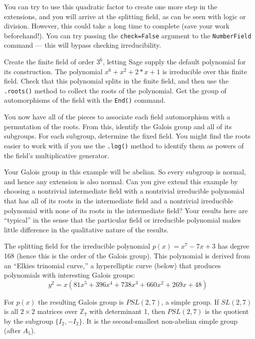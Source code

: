 %
You can try to use this quadratic factor to create one more step in the extensions, and you will arrive at the splitting field, as can be seen with logic or division.  However, this could take a long time to complete (save your work beforehand!).  You can try passing the \verb?check=False? argument to the \verb?NumberField? command --- this will bypass checking irreducibility.
\begin{sageverbatim}\end{sageverbatim}
%
%
Create the finite field of order $3^6$, letting Sage supply the default polynomial for its construction.  The polynomial $x^6+x^2+2*x+1$ is irreducible over this finite field.  Check that this polynomial splits in the finite field, and then use the \verb?.roots()? method to collect the roots of the polynomial.  Get the group of automorphisms of the field with the \verb?End()? command.\par
%
You now have all of the pieces to associate each field automorphism with a permutation of the roots.  From this, identify the Galois group and all of its subgroups.  For each subgroup, determine the fixed field.  You might find the roots easier to work with if you use the \verb?.log()? method to identify them as powers of the field's multiplicative generator.\par
%
Your Galois group in this example will be abelian.  So every subgroup is normal, and hence any extension is also normal.  Can you give extend this example by choosing a nontrivial intermediate field with a nontrivial irreducible polynomial that has all of its roots in the intermediate field and a nontrivial irreducible polynomial with none of its roots in the intermediate field?
%
Your results here are ``typical'' in the sense that the particular field or irreducible polynomial makes little difference in the qualitative nature of the results.
\begin{sageverbatim}\end{sageverbatim}
%
%
The splitting field for the irreducible polynomial $p(x)=x^7-7x+3$ has degree 168 (hence this is the order of the Galois group).  This polynomial is derived from an ``Elkies trinomial curve,'' a hyperelliptic curve (below) that produces polynomials with interesting Galois groups:
$$y^2 = x(81x^5 + 396x^4 + 738x^3 + 660x^2 + 269x + 48)$$\par
%
For $p(x)$ the resulting Galois group is $PSL(2,7)$, a simple group.  If $SL(2,7)$ is all $2\times 2$ matrices over ${\mathbb Z}_7$ with determinant 1, then $PSL(2,7)$ is the quotient by the subgroup $\{I_2,-I_2\}$.  It is the second-smallest non-abelian simple group (after $A_5$).\par
